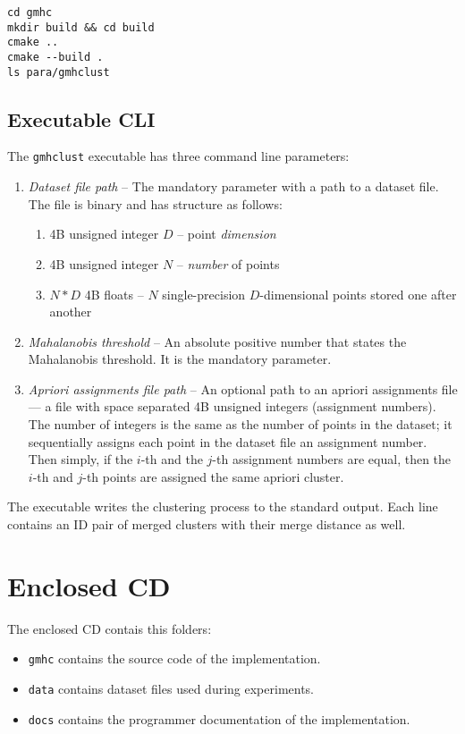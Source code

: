 \documentclass[12pt,a4paper,twoside,openright]{report}
\let\openright=\cleardoublepage
\begin{document}
\begin{lstlisting}
cd gmhc
mkdir build && cd build
cmake ..
cmake --build .
ls para/gmhclust
\end{lstlisting}

\section{Executable CLI}

The \texttt{gmhclust} executable has three command line parameters:
\begin{enumerate}
	\item \emph{Dataset file path} -- The mandatory parameter with a path to a dataset file. The file is binary and has structure as follows:
	\begin{enumerate}
		\item 4B unsigned integer $D$ -- point \emph{dimension}
		\item 4B unsigned integer $N$ -- \emph{number} of points
		\item $N*D$ 4B floats -- $N$ single-precision $D$-dimensional points stored one after another
	\end{enumerate}
	\item \emph{Mahalanobis threshold} -- An absolute positive number that states the Mahalanobis threshold. It is the mandatory parameter.
	\item \emph{Apriori assignments file path} -- An optional path to an apriori assignments file --- a file with space separated 4B unsigned integers (assignment numbers). The number of integers is the same as the number of points in the dataset; it sequentially assigns each point in the dataset file an assignment number. Then simply, if the $i$-th and the $j$-th assignment numbers are equal, then the $i$-th and $j$-th points are assigned the same apriori cluster. 
\end{enumerate}

The executable writes the clustering process to the standard output. Each line contains an ID pair of merged clusters with their merge distance as well.

\chapter{Enclosed CD}

The enclosed CD contais this folders:

\begin{itemize}
	\item \texttt{gmhc} contains the source code of the implementation.
	\item \texttt{data} contains dataset files used during experiments.
	\item \texttt{docs} contains the programmer documentation of the implementation.
\end{itemize} 


\openright
\end{document}
